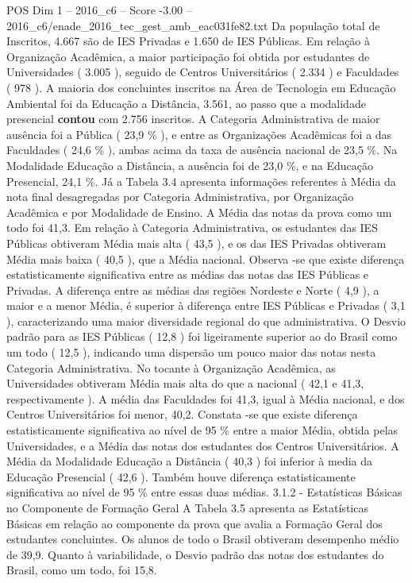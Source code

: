 \begin{textsample}{POS Dim 1 – 2016\_c6 – Score -3.00 – 2016\_c6/enade\_2016\_tec\_gest\_amb\_eac031fe82.txt}
Da população total de Inscritos, 4.667 são de IES Privadas e 1.650 de IES Públicas.
Em relação à Organização Acadêmica, a maior participação foi obtida por estudantes de Universidades ( 3.005 ), seguido de Centros Universitários ( 2.334 ) e Faculdades ( 978 ).
A maioria dos concluintes inscritos na Área de Tecnologia em Educação Ambiental foi da Educação a Distância, 3.561, ao passo que a modalidade presencial \textbf{contou} com 2.756 inscritos.
A Categoria Administrativa de maior ausência foi a Pública ( 23,9 \% ), e entre as Organizações Acadêmicas foi a das Faculdades ( 24,6 \% ), ambas acima da taxa de ausência nacional de 23,5 \%.
Na Modalidade Educação a Distância, a ausência foi de 23,0 \%, e na Educação Presencial, 24,1 \%.
Já a Tabela 3.4 apresenta informações referentes à Média da nota final desagregadas por Categoria Administrativa, por Organização Acadêmica e por Modalidade de Ensino.
A Média das notas da prova como um todo foi 41,3.
Em relação à Categoria Administrativa, os estudantes das IES Públicas obtiveram Média mais alta ( 43,5 ), e os das IES Privadas obtiveram Média mais baixa ( 40,5 ), que a Média nacional.
Observa -se que existe diferença estatisticamente significativa entre as médias das notas das IES Públicas e Privadas.
A diferença entre as médias das regiões Nordeste e Norte ( 4,9 ), a maior e a menor Média, é superior à diferença entre IES Públicas e Privadas ( 3,1 ), caracterizando uma maior diversidade regional do que administrativa.
O Desvio padrão para as IES Públicas ( 12,8 ) foi ligeiramente superior ao do Brasil como um todo ( 12,5 ), indicando uma dispersão um pouco maior das notas nesta Categoria Administrativa.
No tocante à Organização Acadêmica, as Universidades obtiveram Média mais alta do que a nacional ( 42,1 e 41,3, respectivamente ).
A média das Faculdades foi 41,3, igual à Média nacional, e dos Centros Universitários foi menor, 40,2.
Constata -se que existe diferença estatisticamente significativa ao nível de 95 \% entre a maior Média, obtida pelas Universidades, e a Média das notas dos estudantes dos Centros Universitários.
A Média da Modalidade Educação a Distância ( 40,3 ) foi inferior à media da Educação Presencial ( 42,6 ).
Também houve diferença estatisticamente significativa ao nível de 95 \% entre essas duas médias. 3.1.2 - Estatísticas Básicas no Componente de Formação Geral A Tabela 3.5 apresenta as Estatísticas Básicas em relação ao componente da prova que avalia a Formação Geral dos estudantes concluintes.
Os alunos de todo o Brasil obtiveram desempenho médio de 39,9.
Quanto à variabilidade, o Desvio padrão das notas dos estudantes do Brasil, como um todo, foi 15,8.

\end{textsample}

